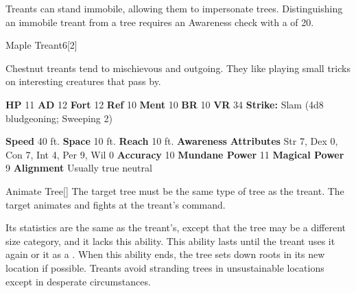         Treants can stand immobile, allowing them to impersonate trees.
        Distinguishing an immobile treant from a tree requires an Awareness check with a  of 20.
  

  \begin{monsubsection}{Maple Treant}{6}[2]
    \vspace{-1em}\vspace{-1em}
    \vspace{0em}

    
          Chestnut treants tend to mischievous and outgoing.
          They like playing small tricks on interesting creatures that pass by.
        

    \begin{spellcontent}
      \begin{spelltargetinginfo}
        \pari \textbf{HP} 11 \monsep
          \textbf{AD} 12 \monsep
          \textbf{Fort} 12 \monsep
          \textbf{Ref} 10 \monsep
          \textbf{Ment} 10
        \pari \textbf{BR} 10 \monsep
        \textbf{VR} 34
        \pari \textbf{Strike:}
            Slam  (4d8 bludgeoning; Sweeping 2)
      \end{spelltargetinginfo}
    \end{spellcontent}
    \begin{monsterfooter}
      \pari \textbf{Speed} 40 ft. \monsep
        \textbf{Space} 10 ft. \monsep
        \textbf{Reach} 10 ft.
      \pari \textbf{Awareness} 
      \pari \textbf{Attributes}
        Str 7, Dex 0,
        Con 7, Int 4,
        Per 9, Wil 0
      \pari \textbf{Accuracy} 10 \monsep
        \textbf{Mundane Power} 11 \monsep
      \textbf{Magical Power} 9
      \pari \textbf{Alignment} Usually true neutral
    \end{monsterfooter}
  \end{monsubsection}
  \begin{freeability}{Animate Tree}[]
      The target tree must be the same type of tree as the treant.
        The target animates and fights at the treant's command.

        Its statistics are the same as the treant's, except that the tree may be a different size category, and it lacks this ability.
        This ability lasts until the treant uses it again or  it as a .
        When this ability ends, the tree sets down roots in its new location if possible.
        Treants avoid stranding trees in unsustainable locations except in desperate circumstances.
    \end{freeability}
  

